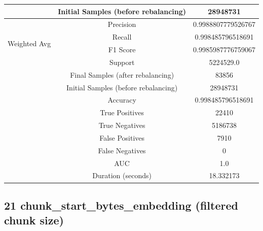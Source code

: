 \begin{longtable}{|c|c|c|}
 & Initial Samples (before rebalancing) & 28948731 \\
\hline
\multirow{4}{*}{Weighted Avg} & Precision & 0.9988807779526767 \\
 & Recall & 0.998485796518691 \\
 & F1 Score & 0.9985987776759067 \\
 & Support & 5224529.0 \\
 & Final Samples (after rebalancing) & 83856 \\
 & Initial Samples (before rebalancing) & 28948731 \\
\hline
& Accuracy & 0.998485796518691 \\ \hline
& True Positives & 22410 \\ \hline
& True Negatives & 5186738 \\ \hline
& False Positives & 7910 \\ \hline
& False Negatives & 0 \\ \hline
& AUC & 1.0 \\ \hline
& Duration (seconds) & 18.332173 \\ \hline
\end{longtable}


\subsection{21 chunk\_start\_bytes\_embedding (filtered chunk size)}

